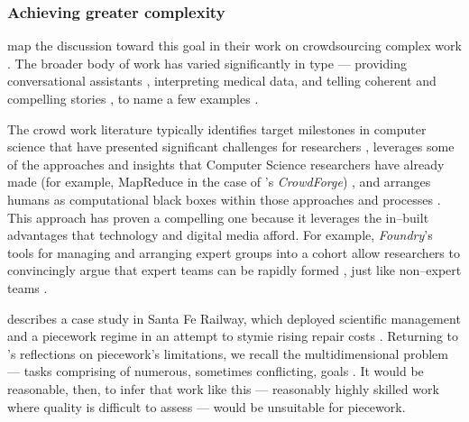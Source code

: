 \documentclass[trackingWork]{subfiles}
\begin{document}
\subsubsection[finding crowd work's limits]{Achieving greater complexity}\label{sec:complexity}
\subsubsubsection{\crowdworkpers}
\citeauthor{crowdForgeKittur}
map the discussion toward this goal in their work on
crowdsourcing complex work
\cite{crowdForgeKittur}.
The broader body of work has varied significantly in type
--- providing conversational assistants%
, interpreting medical data, and
telling coherent and compelling stories%
, to name a few examples
\cite{Lasecki:2013:CCC:2501988.2502057,mavandadi2012distributed,KimStoria}.


The crowd work literature typically identifies target milestones in computer science
that have presented significant challenges for researchers%
, leverages some of the approaches and insights that Computer Science researchers have already made
(for example, MapReduce in the case of \citeauthor{crowdForgeKittur}'s \textit{CrowdForge})%
, and arranges humans as computational black boxes within those approaches and processes
\cite[][and others]{crowdForgeKittur,foundry}.
This approach has proven a compelling one because
it leverages the in--built advantages that technology and digital media afford.
For example, \textit{Foundry}'s tools for managing and arranging expert groups into a cohort
allow researchers to convincingly argue that expert teams can be rapidly formed%
, just like non--expert teams
\cite{foundry}.



\subsubsubsection{\pieceworkpers}
\citeauthor{10.2307/23702539} describes a case study in Santa Fe Railway, which
deployed scientific management and a piecework regime in an attempt to stymie rising repair costs
\cite{10.2307/23702539}.
Returning to \citeauthor{hart2016rise}'s reflections on piecework's limitations,
we recall the multidimensional problem
--- tasks comprising of numerous, sometimes conflicting, goals
\cite{hart2016rise}.
It would be reasonable, then, to infer that work like this
--- reasonably highly skilled work where quality is difficult to assess ---
would be unsuitable for piecework. 
\end{document}
